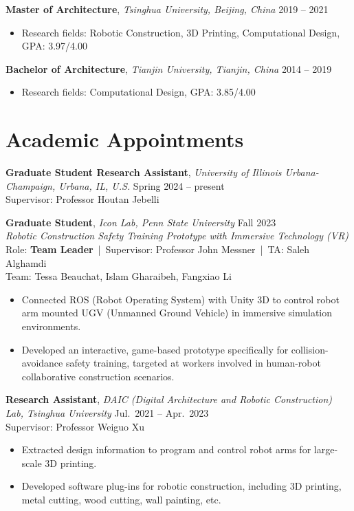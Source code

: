 \documentclass[11pt,a4paper]{article}
\newcommand{\entrytitle}[1]{\textbf{#1}}
\newcommand{\entrydetail}[1]{\textit{#1}}
\begin{document}
\entrytitle{Master of Architecture}, \entrydetail{Tsinghua University, Beijing, China} \hfill 2019 -- 2021 \\[-1.5em]
\begin{itemize}[nosep, leftmargin=1.5em]
    \item Research fields: Robotic Construction, 3D Printing, Computational Design, GPA: 3.97/4.00
\end{itemize}

\entrytitle{Bachelor of Architecture}, \entrydetail{Tianjin University, Tianjin, China} \hfill 2014 -- 2019 \\[-1.5em]
\begin{itemize}[nosep, leftmargin=1.5em]
    \item Research fields: Computational Design, GPA: 3.85/4.00
\end{itemize}

\section{Academic Appointments}

\entrytitle{Graduate Student Research Assistant}, \entrydetail{University of Illinois Urbana-Champaign, Urbana, IL, U.S.} \hfill Spring 2024 -- present \\
Supervisor: Professor Houtan Jebelli

\entrytitle{Graduate Student}, \entrydetail{Icon Lab, Penn State University} \hfill Fall 2023 \\
\entrydetail{Robotic Construction Safety Training Prototype with Immersive Technology (VR)} \\
Role: \textbf{Team Leader} \,|\, Supervisor: Professor John Messner \,|\, TA: Saleh Alghamdi \\
Team: Tessa Beauchat, Islam Gharaibeh, Fangxiao Li
\begin{itemize}[nosep, leftmargin=1.5em]
    \item Connected ROS (Robot Operating System) with Unity 3D to control robot arm mounted UGV (Unmanned Ground Vehicle) in immersive simulation environments.
    \item Developed an interactive, game-based prototype specifically for collision-avoidance safety training, targeted at workers involved in human-robot collaborative construction scenarios.
\end{itemize}

\entrytitle{Research Assistant}, \entrydetail{DAIC (Digital Architecture and Robotic Construction) Lab, Tsinghua University} \hfill Jul.\ 2021 -- Apr.\ 2023 \\
Supervisor: Professor Weiguo Xu
\begin{itemize}[nosep, leftmargin=1.5em]
    \item Extracted design information to program and control robot arms for large-scale 3D printing.
    \item Developed software plug-ins for robotic construction, including 3D printing, metal cutting, wood cutting, wall painting, etc.
\end{itemize}
\end{document}
